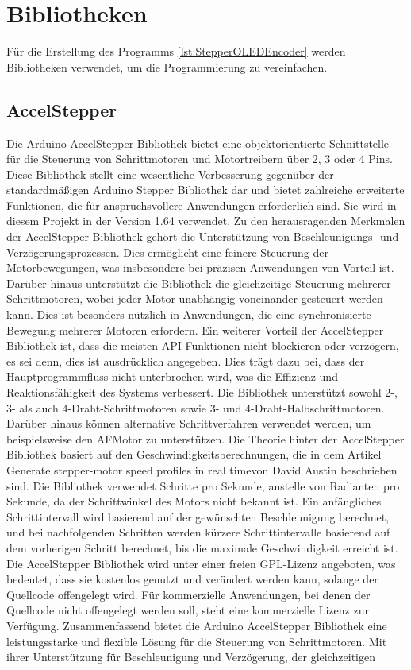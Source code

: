 {{{			%
			
			
			\section{Bibliotheken}
			Für die Erstellung des Programms \ref{lst:StepperOLEDEncoder} werden Bibliotheken verwendet, um die Programmierung zu vereinfachen.
			
			\subsection{AccelStepper}
			
			Die Arduino AccelStepper Bibliothek bietet eine objektorientierte Schnittstelle für die Steuerung von Schrittmotoren und Motortreibern über 2, 3 oder 4 Pins. Diese Bibliothek stellt eine wesentliche Verbesserung gegenüber der standardmäßigen Arduino Stepper Bibliothek dar und bietet zahlreiche erweiterte Funktionen, die für anspruchsvollere Anwendungen erforderlich sind. Sie wird in diesem Projekt in der Version 1.64 verwendet. Zu den herausragenden Merkmalen der AccelStepper Bibliothek gehört die Unterstützung von Beschleunigungs- und Verzögerungsprozessen. Dies ermöglicht eine feinere Steuerung der Motorbewegungen, was insbesondere bei präzisen Anwendungen von Vorteil ist. Darüber hinaus unterstützt die Bibliothek die gleichzeitige Steuerung mehrerer Schrittmotoren, wobei jeder Motor unabhängig voneinander gesteuert werden kann. Dies ist besonders nützlich in Anwendungen, die eine synchronisierte Bewegung mehrerer Motoren erfordern. Ein weiterer Vorteil der AccelStepper Bibliothek ist, dass die meisten API-Funktionen nicht blockieren oder verzögern, es sei denn, dies ist ausdrücklich angegeben. Dies trägt dazu bei, dass der Hauptprogrammfluss nicht unterbrochen wird, was die Effizienz und Reaktionsfähigkeit des Systems verbessert. Die Bibliothek unterstützt sowohl 2-, 3- als auch 4-Draht-Schrittmotoren sowie 3- und 4-Draht-Halbschrittmotoren. Darüber hinaus können alternative Schrittverfahren verwendet werden, um beispielsweise den AFMotor zu unterstützen. Die Theorie hinter der AccelStepper Bibliothek basiert auf den Geschwindigkeitsberechnungen, die in dem Artikel \glqq Generate stepper-motor speed profiles in real time\grqq von David Austin beschrieben sind. Die Bibliothek verwendet Schritte pro Sekunde, anstelle von Radianten pro Sekunde, da der Schrittwinkel des Motors nicht bekannt ist. Ein anfängliches Schrittintervall wird basierend auf der gewünschten Beschleunigung berechnet, und bei nachfolgenden Schritten werden kürzere Schrittintervalle basierend auf dem vorherigen Schritt berechnet, bis die maximale Geschwindigkeit erreicht ist. Die AccelStepper Bibliothek wird unter einer freien GPL-Lizenz angeboten, was bedeutet, dass sie kostenlos genutzt und verändert werden kann, solange der Quellcode offengelegt wird. Für kommerzielle Anwendungen, bei denen der Quellcode nicht offengelegt werden soll, steht eine kommerzielle Lizenz zur Verfügung. Zusammenfassend bietet die Arduino AccelStepper Bibliothek eine leistungsstarke und flexible Lösung für die Steuerung von Schrittmotoren. Mit ihrer Unterstützung für Beschleunigung und Verzögerung, der gleichzeitigen }}}
